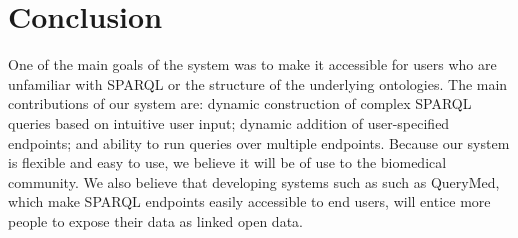 \documentclass{acm_proc_article-sp}
\begin{document}

\section{Conclusion}
\label{conclusion}

One of the main goals of the system was to make it accessible for users who are unfamiliar with SPARQL or the structure of the underlying ontologies.
The main contributions of our system are: dynamic construction of complex SPARQL queries based on intuitive user input; dynamic addition of user-specified endpoints; and ability to run queries over multiple endpoints. Because our system is flexible and easy to use, we believe it will be of use to the biomedical community.  We also believe that developing systems such as such as QueryMed, which make SPARQL endpoints  easily accessible to end users, will entice more people to expose their data as linked open data.



\end{document}
